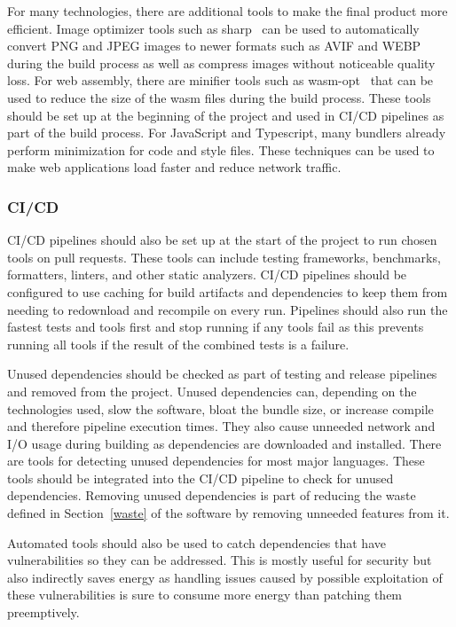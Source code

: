 For many technologies, there are additional tools to make the final product more efficient. Image optimizer tools such as sharp~\cite{pixelplumbingSharpHigh} can be used to automatically convert PNG and JPEG images to newer formats such as AVIF and WEBP during the build process as well as compress images without noticeable quality loss. For web assembly, there are minifier tools such as wasm-opt~\cite{githubGitHubWebAssemblybinaryen} that can be used to reduce the size of the wasm files during the build process. These tools should be set up at the beginning of the project and used in CI/CD pipelines as part of the build process. For JavaScript and Typescript, many bundlers already perform minimization for code and style files. These techniques can be used to make web applications load faster and reduce network traffic.

\subsubsection{CI/CD}
CI/CD pipelines should also be set up at the start of the project to run chosen tools on pull requests. These tools can include testing frameworks, benchmarks, formatters, linters, and other static analyzers. CI/CD pipelines should be configured to use caching for build artifacts and dependencies to keep them from needing to redownload and recompile on every run. Pipelines should also run the fastest tests and tools first and stop running if any tools fail as this prevents running all tools if the result of the combined tests is a failure.

Unused dependencies should be checked as part of testing and release pipelines and removed from the project. Unused dependencies can, depending on the technologies used, slow the software, bloat the bundle size, or increase compile and therefore pipeline execution times. They also cause unneeded network and I/O usage during building as dependencies are downloaded and installed. There are tools for detecting unused dependencies for most major languages. These tools should be integrated into the CI/CD pipeline to check for unused dependencies. Removing unused dependencies is part of reducing the waste defined in Section~\ref{waste} of the software by removing unneeded features from it.

Automated tools should also be used to catch dependencies that have vulnerabilities so they can be addressed. This is mostly useful for security but also indirectly saves energy as handling issues caused by possible exploitation of these vulnerabilities is sure to consume more energy than patching them preemptively.

